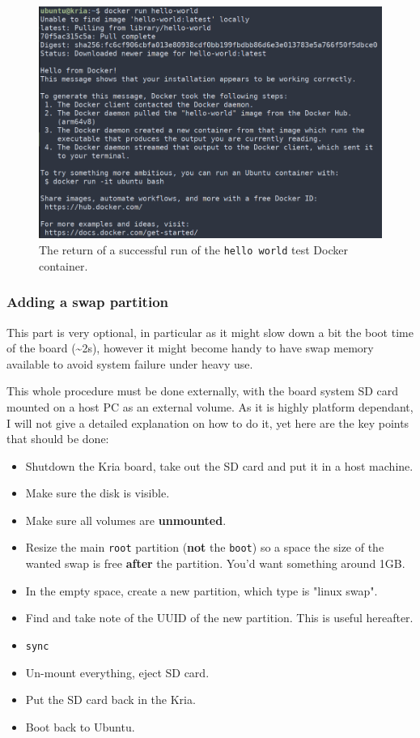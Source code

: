 \documentclass[10pt]{article}
\begin{document}
\begin{figure}[htbp]
\centering
\includegraphics[width=.7\textwidth]{img/hello-docker.png}
\caption{\label{fig:org0bb8032}The return of a successful run of the \texttt{hello world} test Docker container.}
\end{figure}

\subsubsection{Adding a swap partition}
\label{sec:orgfb32113}
This part is very optional, in particular as it might slow down a bit the
boot time of the board (\textasciitilde{}2s), however it might become handy to have swap memory
available to avoid system failure under heavy use.

This whole procedure must be done externally, with the board system SD card
mounted on a host PC as an external volume.  As it is highly platform dependant,
I will not give a detailed explanation on how to do it, yet here are the key
points that should be done:
\begin{itemize}
\item Shutdown the Kria board, take out the SD card and put it in a host machine.
\item Make sure the disk is visible.
\item Make sure all volumes are \textbf{unmounted}.
\item Resize the main \texttt{root} partition (\textbf{not} the \texttt{boot}) so a space the size of the
wanted swap is free \textbf{after} the partition. You'd want something around 1GB.
\item In the empty space, create a new partition, which type is "linux swap".
\item Find and take note of the UUID of the new partition. This is useful hereafter.
\item \texttt{sync}
\item Un-mount everything, eject SD card.
\item Put the SD card back in the Kria.
\item Boot back to Ubuntu.
\end{itemize}
\end{document}
